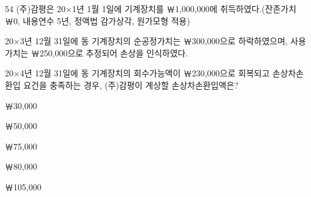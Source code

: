 \begin{question}{54}
(주)감평은 20×1년 1월 1일에 기계장치를 ￦1,000,000에 취득하였다.(잔존가치 ￦0, 내용연수 5년, 정액법 감가상각, 원가모형 적용) \par
20×3년 12월 31일에 동 기계장치의 순공정가치는 ￦300,000으로 하락하였으며, 사용가치는 ￦250,000으로 추정되어 손상을 인식하였다. \par
20×4년 12월 31일에 동 기계장치의 회수가능액이 ￦230,000으로 회복되고 손상차손환입 요건을 충족하는 경우, (주)감평이 계상할 손상차손환입액은?
\begin{choices}
  \item ￦30,000
  \item ￦50,000
  \item ￦75,000
  \item ￦80,000
  \item ￦105,000
\end{choices}
\end{question}
